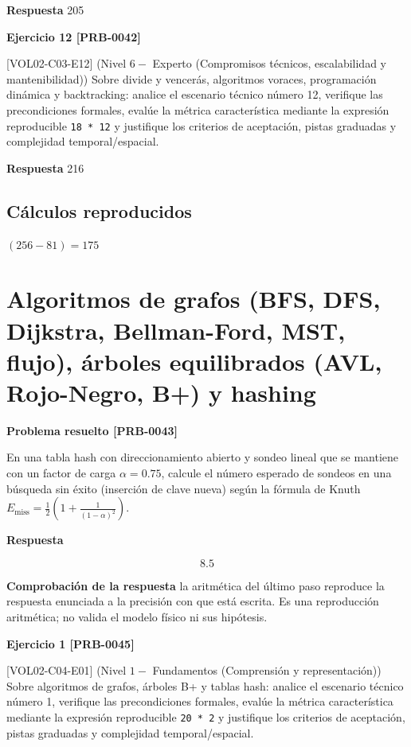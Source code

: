 \documentclass{book}
\begin{document}
\noindent\textbf{Respuesta} 205

\noindent\textbf{Ejercicio 12 [PRB-0042]}

[VOL02-C03-E12] (Nivel \(6 -\) Experto (Compromisos técnicos, escalabilidad y mantenibilidad)) Sobre divide y vencerás, algoritmos voraces, programación dinámica y backtracking: analice el escenario técnico número 12, verifique las precondiciones formales, evalúe la métrica característica mediante la expresión reproducible \texttt{18 * 12} y justifique los criterios de aceptación, pistas graduadas y complejidad temporal/espacial.

\noindent\textbf{Respuesta} 216

\subsection*{Cálculos reproducidos}

\(\left(256-81\right) = 175\)

\section{Algoritmos de grafos (BFS, DFS, Dijkstra, Bellman-Ford, MST, flujo), árboles equilibrados (AVL, Rojo-Negro, B+) y hashing}

\noindent\textbf{Problema resuelto [PRB-0043]}

En una tabla hash con direccionamiento abierto y sondeo lineal que se mantiene con un factor de carga \(\alpha = 0.75\), calcule el número esperado de sondeos en una búsqueda sin éxito (inserción de clave nueva) según la fórmula de Knuth \(E_{\text{miss}} = \frac{1}{2}\left(1 + \frac{1}{(1 - \alpha)^2}\right)\).

\noindent\textbf{Respuesta}

\[
8.5
\]

\noindent\textbf{Comprobación de la respuesta} la aritmética del último paso reproduce la respuesta enunciada a la precisión con que está escrita. Es una reproducción aritmética; no valida el modelo físico ni sus hipótesis.

\noindent\textbf{Ejercicio 1 [PRB-0045]}

[VOL02-C04-E01] (Nivel \(1 -\) Fundamentos (Comprensión y representación)) Sobre algoritmos de grafos, árboles B+ y tablas hash: analice el escenario técnico número 1, verifique las precondiciones formales, evalúe la métrica característica mediante la expresión reproducible \texttt{20 * 2} y justifique los criterios de aceptación, pistas graduadas y complejidad temporal/espacial.
\end{document}
